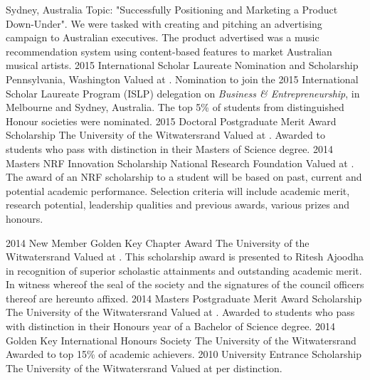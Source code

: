 \documentclass[]{friggeri-cv} %
\begin{document}
\begin{entrylist}
{Sydney,  Australia}
{Topic: "Successfully Positioning and Marketing a Product Down-Under". We were tasked with creating and pitching an advertising campaign to Australian executives. The product advertised was a music recommendation system using content-based features to market Australian musical artists.}
\entry
{2015}
{International Scholar Laureate Nomination and Scholarship}
{Pennsylvania,  Washington}
{Valued at {\bf \color{ForestGreen}{\$1 000}}. Nomination to join the 2015 International Scholar Laureate Program (ISLP) delegation on \textit{Business \& Entrepreneurship}, in Melbourne and Sydney, Australia. The top 5\% of students from distinguished Honour societies were nominated.}
\entry
{2015}
{Doctoral Postgraduate Merit Award Scholarship}
{The University of the Witwatersrand}
{Valued at {\bf \color{ForestGreen}{R40 000}}. Awarded to students who pass with distinction in their Masters of Science degree.}
\entry
{2014}
{Masters NRF Innovation Scholarship}
{National Research Foundation}
{Valued at {\bf \color{ForestGreen}{R40 000}}.  The award of an NRF scholarship to a student will be based on past, current and potential academic performance. Selection criteria will include academic merit, research potential, leadership qualities and previous awards, various prizes and honours.}
\end{entrylist}
\begin{entrylist}
\entry
{2014}
{New Member Golden Key Chapter Award}
{The University of the Witwatersrand}
{Valued at {\bf \color{ForestGreen}{R2 500}}. This scholarship award is presented to Ritesh Ajoodha in recognition of superior scholastic attainments and outstanding academic merit. In witness whereof the seal of the society and the signatures of the council officers thereof are hereunto affixed.}
\entry
{2014}
{Masters Postgraduate Merit Award Scholarship}
{The University of the Witwatersrand}
{Valued at {\bf \color{ForestGreen}{R40 000}}. Awarded to students who pass with distinction in their Honours year of a Bachelor of Science degree.}
\entry
{2014}
{Golden Key International Honours Society}
{The University of the Witwatersrand}
{Awarded to top 15\% of academic achievers.}
\entry
{2010}
{University Entrance Scholarship}
{The University of the Witwatersrand}
{Valued at {\bf \color{ForestGreen}{R4 000}} per distinction.}
\end{entrylist}
\end{document}

